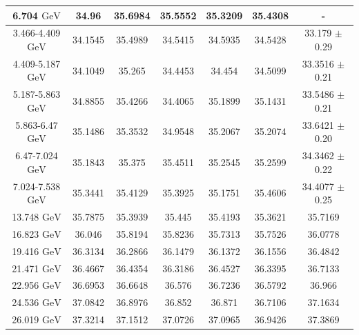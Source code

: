 \documentclass[11pt]{article}
\begin{document}
\begin{table}[htbp]
{\begin{tabular}{ccccccc}
				6.704 ${\textrm{GeV}}$ & 34.96 & 35.6984 & 35.5552 & 35.3209 & 35.4308 & - \\
				\midrule
				3.466-4.409 ${\textrm{GeV}}$ & 34.1545 & 35.4989 & 34.5415 & 34.5935 & 34.5428 & 33.179 $\pm$ 0.29  \\
				4.409-5.187 ${\textrm{GeV}}$ & 34.1049 & 35.265 & 34.4453 & 34.454 & 34.5099 & 33.3516 $\pm$ 0.21  \\
				5.187-5.863 ${\textrm{GeV}}$ & 34.8855 & 35.4266 & 34.4065 & 35.1899 & 35.1431 & 33.5486 $\pm$ 0.21  \\
				5.863-6.47 ${\textrm{GeV}}$ & 35.1486 & 35.3532 & 34.9548 & 35.2067 & 35.2074 & 33.6421 $\pm$ 0.20  \\
				6.47-7.024 ${\textrm{GeV}}$ & 35.1843 & 35.375 & 35.4511 & 35.2545 & 35.2599 & 34.3462 $\pm$ 0.22  \\
				7.024-7.538 ${\textrm{GeV}}$ & 35.3441 & 35.4129 & 35.3925 & 35.1751 & 35.4606 & 34.4077 $\pm$ 0.25  \\
				\midrule
				13.748 ${\textrm{GeV}}$ & 35.7875 & 35.3939 & 35.445 & 35.4193 & 35.3621 & 35.7169  \\
				16.823 ${\textrm{GeV}}$ & 36.046 & 35.8194 & 35.8236 & 35.7313 & 35.7526 & 36.0778  \\
				19.416 ${\textrm{GeV}}$ & 36.3134 & 36.2866 & 36.1479 & 36.1372 & 36.1556 & 36.4842  \\
				21.471 ${\textrm{GeV}}$ & 36.4667 & 36.4354 & 36.3186 & 36.4527 & 36.3395 & 36.7133  \\
				22.956 ${\textrm{GeV}}$ & 36.6953 & 36.6648 & 36.576 & 36.7236 & 36.5792 & 36.966  \\
				24.536 ${\textrm{GeV}}$ & 37.0842 & 36.8976 & 36.852 & 36.871 & 36.7106 & 37.1634  \\
				26.019 ${\textrm{GeV}}$ & 37.3214 & 37.1512 & 37.0726 & 37.0965 & 36.9426 & 37.3869  \\
				\bottomrule
				\bottomrule
			\end{tabular}
}
\end{table}
\end{document}
